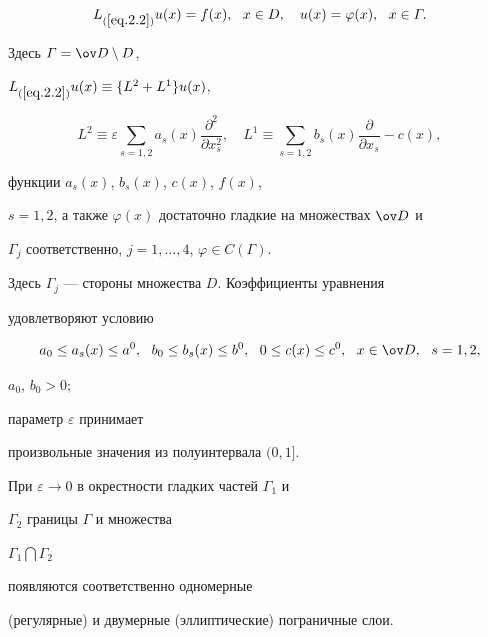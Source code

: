 \begin{equation} \label{eq.2.2}


L_{(\ref{eq.2.2})}u(x)=f(x), \ \ x\in D, \quad 


u(x)=\varphi(x), \ \ x\in \varGamma.


\end{equation}


Здесь $\varGamma=\ov D\setminus D$,


$L_{(\ref{eq.2.2})}u(x)\equiv\{L^2+L^1\}u(x)$,


$$


L^2\equiv\varepsilon\sum\limits_{s=1,2}a_{s}(x)


\frac{\partial^2}{\partial x_s^2},\quad


L^1\equiv\sum\limits_{s=1,2}b_s(x)\frac{\partial}{\partial


x_s}-c(x),


$$


функции $a_s(x)$, $b_s(x)$, $c(x)$, $f(x)$,


$s=1,2$, а также $\varphi(x)$ достаточно гладкие на множествах $\ov D$ и


$\varGamma_j$ соответственно, $j=1,\dotsc,4$, $\varphi\in C(\varGamma)$.


Здесь $\varGamma_j$ --- стороны множества $D$. Коэффициенты уравнения


удовлетворяют условию


\begin{equation} \label{eq.2.3}


a_0\le a_s(x)\le a^0,


\ \ b_0\le b_s(x)\le b^0, \ \ 0\le c(x)\le c^0, \ \ x\in \ov D, 


\ \ s=1, 2,


\end{equation}


$a_0$, $b_0>0$;


параметр $\varepsilon$ принимает


произвольные значения из полуинтервала $(0,1]$.





При $\varepsilon\to 0$ в окрестности гладких частей $\varGamma_1$ и


$\varGamma_2$ границы $\varGamma$ и множества


$\varGamma_1\bigcap \varGamma_2$


появляются соответственно одномерные


(регулярные) и двумерные (эллиптические) пограничные слои.


